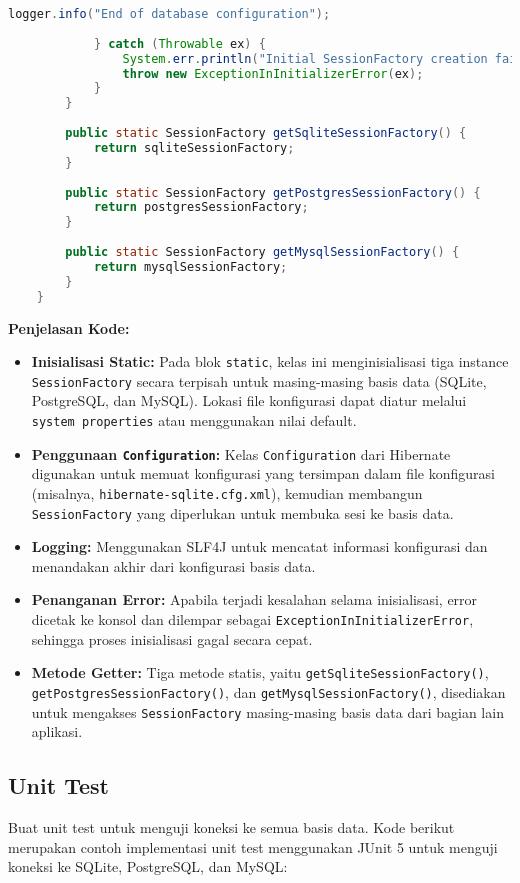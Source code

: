 \begin{lstlisting}[language=Java, style=JavaStyle]
				logger.info("End of database configuration");
				
			} catch (Throwable ex) {
				System.err.println("Initial SessionFactory creation failed: " + ex);
				throw new ExceptionInInitializerError(ex);
			}
		}
		
		public static SessionFactory getSqliteSessionFactory() {
			return sqliteSessionFactory;
		}
		
		public static SessionFactory getPostgresSessionFactory() {
			return postgresSessionFactory;
		}
		
		public static SessionFactory getMysqlSessionFactory() {
			return mysqlSessionFactory;
		}
	}
\end{lstlisting}

\textbf{Penjelasan Kode:}
\begin{itemize}
	\item \textbf{Inisialisasi Static:} Pada blok \texttt{static}, kelas ini menginisialisasi tiga instance \texttt{SessionFactory} secara terpisah untuk masing-masing basis data (SQLite, PostgreSQL, dan MySQL). Lokasi file konfigurasi dapat diatur melalui \texttt{system properties} atau menggunakan nilai default.
	\item \textbf{Penggunaan \texttt{Configuration}:} Kelas \texttt{Configuration} dari Hibernate digunakan untuk memuat konfigurasi yang tersimpan dalam file konfigurasi (misalnya, \texttt{hibernate-sqlite.cfg.xml}), kemudian membangun \texttt{SessionFactory} yang diperlukan untuk membuka sesi ke basis data.
	\item \textbf{Logging:} Menggunakan SLF4J untuk mencatat informasi konfigurasi dan menandakan akhir dari konfigurasi basis data.
	\item \textbf{Penanganan Error:} Apabila terjadi kesalahan selama inisialisasi, error dicetak ke konsol dan dilempar sebagai \texttt{ExceptionInInitializerError}, sehingga proses inisialisasi gagal secara cepat.
	\item \textbf{Metode Getter:} Tiga metode statis, yaitu \texttt{getSqliteSessionFactory()}, \texttt{getPostgresSessionFactory()}, dan \texttt{getMysqlSessionFactory()}, disediakan untuk mengakses \texttt{SessionFactory} masing-masing basis data dari bagian lain aplikasi.
\end{itemize}


\subsection{Unit Test}
Buat unit test untuk menguji koneksi ke semua basis data. Kode berikut merupakan contoh implementasi unit test menggunakan JUnit 5 untuk menguji koneksi ke SQLite, PostgreSQL, dan MySQL:

